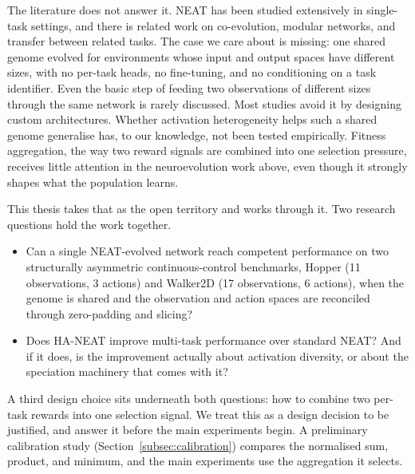\documentclass[12pt]{article}
\begin{document}
% 

The literature does not answer it.
NEAT has been studied extensively in single-task settings, and there is related work on co-evolution, modular networks, and transfer between related tasks.
The case we care about is missing: one shared genome evolved for environments whose input and output spaces have different sizes, with no per-task heads, no fine-tuning, and no conditioning on a task identifier.
Even the basic step of feeding two observations of different sizes through the same network is rarely discussed. Most studies avoid it by designing custom architectures.
Whether activation heterogeneity helps such a shared genome generalise has, to our knowledge, not been tested empirically.
Fitness aggregation, the way two reward signals are combined into one selection pressure, receives little attention in the neuroevolution work above, even though it strongly shapes what the population learns.


This thesis takes that as the open territory and works through it.
Two research questions hold the work together.
\begin{itemize}
    \item Can a single NEAT-evolved network reach competent performance on two structurally asymmetric continuous-control benchmarks, Hopper (11 observations, 3 actions) and Walker2D (17 observations, 6 actions), when the genome is shared and the observation and action spaces are reconciled through zero-padding and slicing?
    \item Does HA-NEAT improve multi-task performance over standard NEAT? And if it does, is the improvement actually about activation diversity, or about the speciation machinery that comes with it?
\end{itemize}
A third design choice sits underneath both questions: how to combine two per-task rewards into one selection signal.
We treat this as a design decision to be justified, and answer it before the main experiments begin.
A preliminary calibration study (Section~\ref{subsec:calibration}) compares the normalised sum, product, and minimum, and the main experiments use the aggregation it selects.
\end{document}
